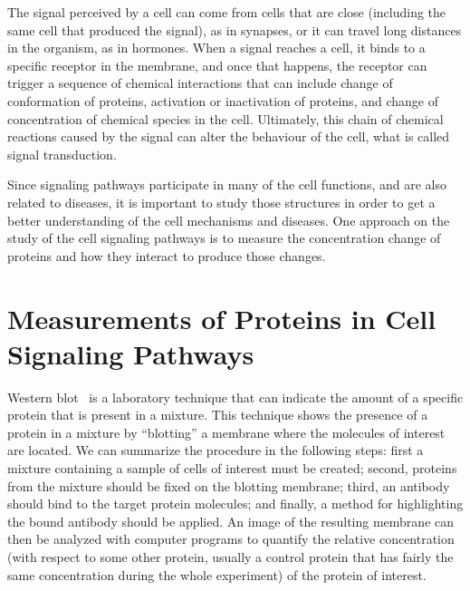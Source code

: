 The signal perceived by a cell can come from cells that are close 
(including the same cell that produced the signal), as in synapses, or 
it can travel long distances in the organism, as in hormones. When a 
signal reaches a cell, it binds to a specific receptor in the membrane,
and once that happens, the receptor can trigger a sequence of chemical 
interactions that can include change of conformation of proteins, 
activation or inactivation of proteins, and change of concentration of
chemical species in the cell. Ultimately, this chain of chemical 
reactions caused by the signal can alter the behaviour of the cell, what 
is called signal transduction.

Since signaling pathways participate in many of the cell functions, and 
are also related to diseases, it is important to study those structures
in order to get a better understanding of the cell mechanisms and 
diseases. One approach on the study of the cell signaling pathways is to 
measure the concentration change of proteins and how they interact to
produce those changes.

\section{Measurements of Proteins in Cell Signaling Pathways}
Western blot~\cite{Towbin1979} is a laboratory technique that can 
indicate the amount of a specific protein that is present in a mixture. 
This technique shows the presence of a protein in a mixture by 
``blotting'' a membrane where the molecules of interest are located. We 
can summarize the procedure in the following steps: first a mixture 
containing a sample of cells of interest must be created; 
second, proteins from the mixture should be fixed on the blotting 
membrane; third, an antibody should bind to the target protein 
molecules; and finally, a method for highlighting the bound antibody 
should be applied. An image of the resulting membrane can then be 
analyzed with computer programs to quantify the relative concentration 
(with respect to some other protein, usually a control protein that has 
fairly the same concentration during the whole experiment) of the 
protein of interest.

